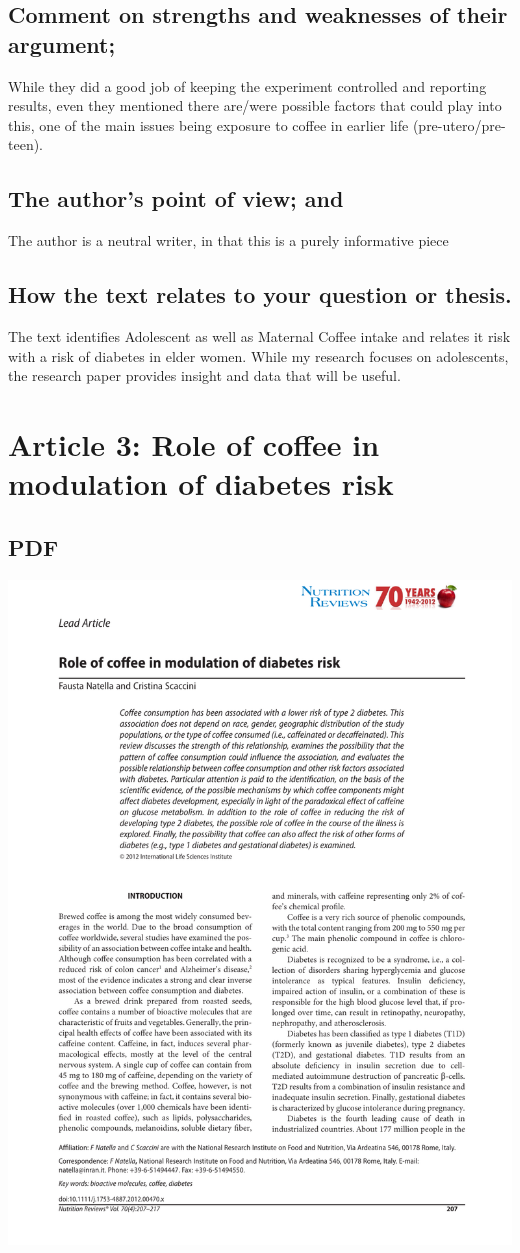 \documentclass{scrartcl}
\begin{document}
\subsection{Comment on strengths and weaknesses of their argument;}
\label{sec:org9232a67}
While they did a good job of keeping the experiment controlled and reporting results, even they mentioned there are/were possible factors that could play into this, one of the main issues being exposure to coffee in earlier life (pre-utero/pre-teen).
\subsection{The author’s point of view; and}
\label{sec:org97b5904}
The author is a neutral writer, in that this is a purely informative piece
\subsection{How the text relates to your question or thesis.}
\label{sec:orge5b1a55}
The text identifies Adolescent as well as Maternal Coffee intake and relates it risk with a risk of diabetes in elder women. While my research focuses on adolescents, the research paper provides insight and data that will be useful.
\section{Article 3: Role of coffee in modulation of diabetes risk}
\label{sec:orgd8dc712}
\subsection{PDF}
\label{sec:orgbbed07d}
\begin{center}
\includegraphics[width=.9\linewidth]{./citations/RoleOfCoffeeIn.pdf}
\end{center}
\end{document}
